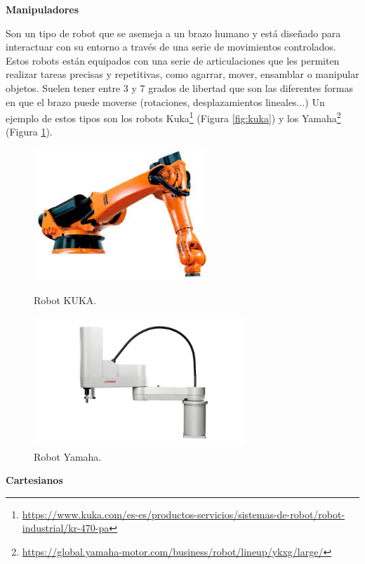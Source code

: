 \noindent\textbf{Manipuladores} 

Son un tipo de robot que se asemeja a un brazo humano y está diseñado para interactuar con su entorno a través de una serie de movimientos controlados. Estos robots están equipados con una serie de articulaciones que les permiten realizar tareas precisas y repetitivas, como agarrar, mover, ensamblar o manipular objetos. Suelen tener entre 3 y 7 grados de libertad que son las diferentes formas en que el brazo puede moverse (rotaciones, desplazamientos lineales...) Un ejemplo de estos tipos son los robots Kuka\footnote{\url{https://www.kuka.com/es-es/productos-servicios/sistemas-de-robot/robot-industrial/kr-470-pa}} (Figura \ref{fig:kuka}) y los Yamaha\footnote{\url{https://global.yamaha-motor.com/business/robot/lineup/ykxg/large/}} (Figura \ref{fig:yamaha}).


\begin{figure}[h!]
  \begin{minipage}{0.48\textwidth}
    \centering
    \includegraphics[width=6.5cm]{figs/kuka}
    \caption{Robot KUKA.}
    \label{fig:kuka}
  \end{minipage}
  \hfill
  \begin{minipage}{0.48\textwidth}
    \centering
    \includegraphics[width=8cm]{figs/yamaha}
    \caption{Robot Yamaha.} 
    \label{fig:yamaha}
  \end{minipage}
\end{figure}

\noindent\textbf{Cartesianos} 

